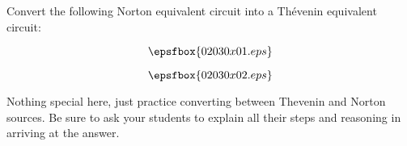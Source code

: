 

Convert the following Norton equivalent circuit into a Th\'evenin equivalent circuit:

$$\epsfbox{02030x01.eps}$$







$$\epsfbox{02030x02.eps}$$







Nothing special here, just practice converting between Thevenin and Norton sources.  Be sure to ask your students to explain all their steps and reasoning in arriving at the answer.




